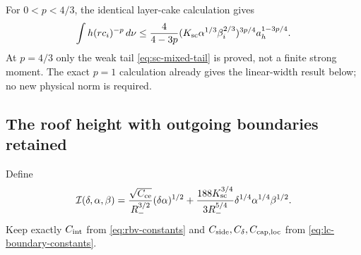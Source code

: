\begin{remark}
\label{rem:sc-endpoint}
For $0<p<4/3$, the identical layer-cake calculation gives
\[
 \int h(rc_i)^{-p}\,d\nu
 \le\frac4{4-3p}
  (K_{\rm sc}\alpha^{1/3}\beta_i^{2/3})^{3p/4}
                                      a_h^{1-3p/4}.
\]
At $p=4/3$ only the weak tail \eqref{eq:sc-mixed-tail} is proved,
not a finite strong moment.  The exact $p=1$ calculation already
gives the linear-width result below; no new physical norm is required.
\end{remark}

\subsection{The roof height with outgoing boundaries retained}
Define
\begin{equation}\label{eq:sc-interior-budget}
 \mathcal I(\delta,\alpha,\beta)
 =\frac{\sqrt{C_{\rm ce}}}{R_-^{3/2}}(\delta\alpha)^{1/2}
  +\frac{188K_{\rm sc}^{3/4}}{3R_-^{5/4}}
                \delta^{1/4}\alpha^{1/4}\beta^{1/2}.
\end{equation}
Keep exactly $C_{\rm int}$ from \eqref{eq:rbv-constants} and
$C_{\rm side},C_\delta,C_{\rm cap,loc}$ from
\eqref{eq:lc-boundary-constants}.


